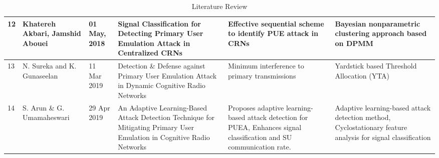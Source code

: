 \begin{table}[]
\begin{tabular}{|p{0.5cm}|p{2.5cm}|p{1.1cm}|p{2.8cm}|p{2.8cm}|p{2.8cm}|}
12 & Khatereh Akbari, Jamshid Abouei & 01 May, 2018 & Signal Classification for Detecting Primary User Emulation Attack in Centralized CRNs & Effective sequential scheme to identify PUE attack in CRNs & Bayesian nonparametric clustering approach based on DPMM \\
\hline
13 & N. Sureka and K. Gunaseelan & 11 Mar 2019 & Detection \& Defense against Primary User Emulation Attack in Dynamic Cognitive Radio Networks & Minimum interference to primary transmissions & Yardstick based Threshold Allocation (YTA) \\
\hline
14 & S. Arun \& G. Umamaheswari & 29 Apr 2019 & An Adaptive Learning-Based Attack Detection Technique for Mitigating Primary User Emulation in Cognitive Radio Networks & Proposes adaptive learning-based attack detection for PUEA, Enhances signal classification and SU communication rate. & Adaptive learning-based attack detection method, Cyclostationary feature analysis for signal classification \\
\hline
\end{tabular}
    \caption{Literature Review}
    \label{tab:LR_view1}
\end{table}


